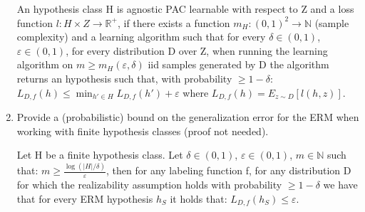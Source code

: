 \documentclass[a4paper,11pt,oneside]{book}
\begin{document}
\begin{enumerate}
\begin{solution}
        An hypothesis class H is agnostic PAC learnable with respect to Z and a loss function $l: 
        H\times Z \to \mathbb{R}^+$, if there exists a function $m_H: (0,1)^2 \to \mathbb{N}$ 
        (sample complexity) and a learning algorithm such that for every $\delta \in (0,1)$, 
        $\varepsilon \in (0,1)$, for every distribution D over Z, when running the learning 
        algorithm on $m \geq m_H(\varepsilon, \delta)$ iid samples generated by D the 
        algorithm returns an hypothesis such that, with probability $\geq 1-\delta$: $L_{D,f}(h) 
        \leq \min_{h'\in H} L_{D,f}(h') + \varepsilon$ where $L_{D,f}(h) = E_{z\sim D}[l(h,z)]$.
        \end{solution}
\item Provide a (probabilistic) bound on the generalization error for the ERM when working with finite hypothesis classes (proof not needed).
    \begin{solution}        
        Let H be a finite hypothesis class. Let $\delta \in (0,1)$, $\varepsilon \in (0,1)$, $m \in 
        \mathbb{N}$ such that: $m \geq \frac{\log(|H|/\delta)}{\varepsilon}$, then for any 
        labeling function f, for any distribution D for which the realizability assumption holds 
        with probability $\geq 1-\delta$ we have that for every ERM hypothesis $h_S$ it holds 
        that: $L_{D,f}(h_S) \leq \varepsilon$.
    \end{solution}
\end{enumerate}

\clearpage
\end{document}
